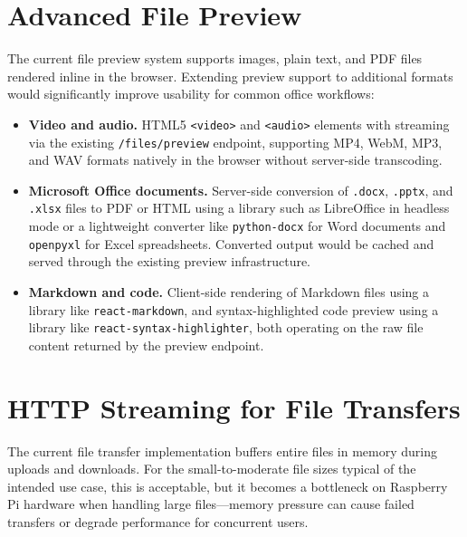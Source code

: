 \documentclass[12pt,letterpaper]{report}
\begin{document}
\section{Advanced File Preview}

The current file preview system supports images, plain text, and PDF files rendered inline in the browser. Extending preview support to additional formats would significantly improve usability for common office workflows:

\begin{itemize}
    \item \textbf{Video and audio.} HTML5 \texttt{<video>} and \texttt{<audio>} elements with streaming via the existing \texttt{/files/preview} endpoint, supporting MP4, WebM, MP3, and WAV formats natively in the browser without server-side transcoding.
    \item \textbf{Microsoft Office documents.} Server-side conversion of \texttt{.docx}, \texttt{.pptx}, and \texttt{.xlsx} files to PDF or HTML using a library such as LibreOffice in headless mode or a lightweight converter like \texttt{python-docx} for Word documents and \texttt{openpyxl} for Excel spreadsheets. Converted output would be cached and served through the existing preview infrastructure.
    \item \textbf{Markdown and code.} Client-side rendering of Markdown files using a library like \texttt{react-markdown}, and syntax-highlighted code preview using a library like \texttt{react-syntax-highlighter}, both operating on the raw file content returned by the preview endpoint.
\end{itemize}

\section{HTTP Streaming for File Transfers}

The current file transfer implementation buffers entire files in memory during uploads and downloads. For the small-to-moderate file sizes typical of the intended use case, this is acceptable, but it becomes a bottleneck on Raspberry Pi hardware when handling large files---memory pressure can cause failed transfers or degrade performance for concurrent users.
\end{document}
